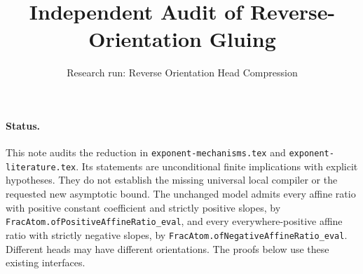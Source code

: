 \documentclass[11pt]{article}
\begin{document}
\title{Independent Audit of Reverse-Orientation Gluing}
\author{Research run: Reverse Orientation Head Compression}
\maketitle

\paragraph{Status.}
This note audits the reduction in \texttt{exponent-mechanisms.tex}
and \texttt{exponent-literature.tex}. Its statements are unconditional
finite implications with explicit hypotheses. They do not establish the
missing universal local compiler or the requested new asymptotic bound.
The unchanged model admits every affine ratio with positive constant
coefficient and strictly positive slopes, by
\texttt{FracAtom.ofPositiveAffineRatio\_eval}, and every everywhere-positive
affine ratio with strictly negative slopes, by
\texttt{FracAtom.ofNegativeAffineRatio\_eval}. Different heads may have
different orientations. The proofs below use these existing interfaces.
\end{document}

